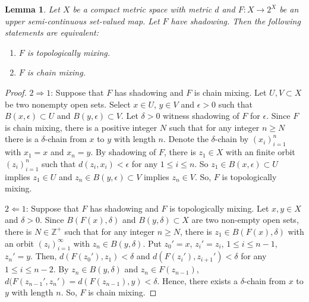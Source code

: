\documentclass[12pt]{amsart}
\newtheorem{lemma}[theorem]{Lemma}
\theoremstyle{definition}
\begin{document}
\begin{lemma}\label{thm6}
	Let $X$ be a compact metric space with metric $d$ and $F:X\rightarrow 2^X$ be an upper semi-continuous set-valued map. Let $F$ have shadowing. Then the following statements are equivalent:
	\begin{enumerate}
		
		\item $F$ is topologically mixing.
		
		\item $F$ is chain mixing.
	\end{enumerate}
\end{lemma}
\begin{proof}
	
	
	{$2\Rightarrow1$}: Suppose that $F$ has shadowing and $F$ is chain mixing. Let $U,V\subset X$ be two nonempty open sets. Select $x\in U$, $y\in V$ and $\epsilon>0$ such that $B(x, \epsilon)\subset U$ and $B(y, \epsilon)\subset V$. Let $\delta>0$ witness shadowing {of $F$} for $\epsilon$. Since $F$ is chain mixing, there is a positive integer $N$ such that for any integer $n\geq N$ there is a $\delta$-chain from $x$ to $y$ with length $n$. Denote the $\delta$-chain by $(x_i)_{i=1}^n$ with $x_1=x$ and $x_n=y$. By shadowing of $F$, there is $z_1\in X$ with an finite orbit $(z_i)_{i=1}^n$ such that $d(z_i, x_i)<\epsilon$ for any $1\leq i\leq n$. So $z_1\in B(x,\epsilon)\subset U$ implies $z_1\in U$ and $z_n\in B(y, \epsilon)\subset V$ implies $z_n\in V$. So, $F$ is topologically mixing.
	
	$2\Leftarrow1$: Suppose that $F$ has shadowing and $F$ is topologically mixing. Let $x,y\in X$ and $\delta>0$. Since $B(F(x),\delta)$ {and} $B(y, \delta)\subset X$ are two non-empty open sets, there is $N\in\mathbb{Z}^+$ such that for any integer $n\geq N$, there is $z_1\in B(F(x), \delta)$ with an orbit $(z_i)_{i=1}^\infty$ with $z_n\in B(y, \delta)$. Put $z_0'=x$, $z_i'=z_i$, $1\leq i\leq n-1$, $z_n'=y$. Then, $d(F(z_0'),z_1)<\delta$ {and} $d(F(z_i'),z_{i+1}')<\delta$ for any $1\leq i\leq n-2$. By $z_n\in B(y,\delta)$ and $z_n\in F(z_{n-1})$,  $d(F(z_{n-1}',z_n')=d(F(z_{n-1}),y)<\delta$. Hence, there exists a $\delta$-chain from $x$ to $y$ with length $n$. So, $F$ is chain mixing.
	
\end{proof}
\end{document}
